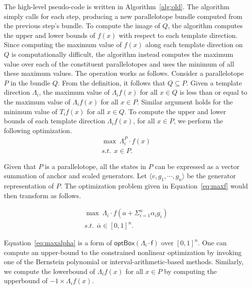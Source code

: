 The high-level pseudo-code is written in Algorithm~\ref{alg:old}.
%
The algorithm simply calls \tbundle for each step, producing a new parallelotope bundle computed from the previous step's bundle.
%
To compute the image of $Q$, the algorithm computes the upper and lower bounds of $f(x)$ with respect to each template direction.
%
Since computing the maximum value of $f(x)$ along each template direction on $Q$ is computationally difficult, the algorithm instead computes the maximum value over each of the constituent parallelotopes and uses the minimum of all these maximum values.
%
The \tbundle operation works as follows.
%
Consider a parallelotope $P$ in the bundle $Q$.
%
From the definition, it follows that $Q \subseteq P$.
%
Given a template direction $\Lambda_i$, the maximum value of $\Lambda_{i} f(x)$ for all $x \in Q$ is less than or equal to the maximum value of $\Lambda_{i} f(x)$ for all $x \in P$.
%
Similar argument holds for the minimum value of $T_{i} f(x)$ for all $x \in Q$.
%
%
%
%
To compute the upper and lower bounds of each template direction $\Lambda_{i} f(x)$, for all $x \in P$, we perform the following optimization.
%
\begin{eqnarray}
  \max ~ \Lambda_i^{P} \cdot f(x) \label{eq:maxf}\\
  s.t. ~~ x \in P.\nonumber
\end{eqnarray}

Given that $P$ is a parallelotope, all the states in $P$ can be expressed as a vector summation of anchor and scaled generators.
%
Let  $\langle v, g_1, \cdots, g_n \rangle$ be the generator representation of $P$.
%
The optimization problem given in Equation~\ref{eq:maxf} would then transform as follows.

\begin{eqnarray}
  \max ~ \Lambda_i \cdot f(a + \Sigma_{i=1}^{n} \alpha_i g_i) \label{eq:maxalpha}\\
  s.t. ~~ \overline\alpha \in [0,1]^{n}.\nonumber
\end{eqnarray}

Equation~\ref{eq:maxalpha} is a form of $\mathsf{optBox(\Lambda_{i} \cdot f)}$ over $[0,1]^n$.
%
One can compute an upper-bound to the constrained nonlinear optimization by invoking one of the Bernstein polynomial or interval-arithmetic-based methods.
%
Similarly, we compute the lowerbound of $\Lambda_{i}f(x)$ for all $x \in P$ by computing the upperbound of $-1 \times \Lambda_{i}f(x)$.
%

